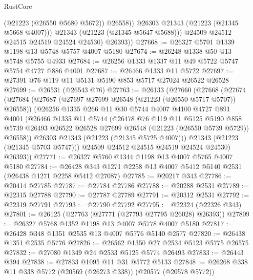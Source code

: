 \begin{lexlean}{RustCore}
\begin{coremodule}
                  (@21223 (@26550 @5680 @5672))
                  @26558))
              @26303
              @21343
              (@21223 (@21345 @5668 @4007)))
            @21343
            (@21223 (@21345 @5647 @5688)))
          @24509
          @24512
          @24515
          @24519
          @24524
          @24530)
        @26393))
@27668 := @26327 @5701 @1339 @1198 @13 @5748 @5757 @4007 @5180
@27674 := @26248 @1338 @50 @13 @5748 @5755 @4933
@27684 := @26256 @1333 @1337 @11 @49 @5722 @5747 @5754 @4727 @886 @4001
@27687 := @26466 @1333 @11 @5722
@27697 := @27391 @76 @119 @11 @5131 @5190 @853 @5717 @27024 @26522 @26528
@27699 := @26531 (@26543 @76)
@27763 := @26133
    (@27660
      (@27668
        (@27674
          (@27684
            (@27687 (@27697 @27699 @26548 (@21223 (@26550 @5717 @5707)) @26558))
            (@26256
              @1335
              @266
              @11
              @30
              @5744
              @4007
              @4100
              @4727
              @891
              @4001
              (@26466
                @1335
                @11
                @5744
                (@26478
                  @76
                  @119
                  @11
                  @5125
                  @5190
                  @858
                  @5739
                  @26493
                  @26522
                  @26528
                  @27699
                  @26548
                  (@21223 (@26550 @5739 @5729))
                  @26558))
              @26303
              @21343
              (@21223 (@21345 @5725 @4007)))
            @21343
            (@21223 (@21345 @5703 @5747)))
          @24509
          @24512
          @24515
          @24519
          @24524
          @24530)
        @26393))
@27771 := @26327 @5760 @1344 @1198 @13 @4007 @5765 @4007 @5180
@27784 := @26428 @343 @1271 @2258 @13 @4007 @5412 @5140 @2531 (@26438 @1271 @2258 @5412 @27087)
@27785 := @20217 @343
@27786 := @20414 @27785
@27787 := @27784 @27786
@27788 := @20288 @2531
@27789 := @22315 @27788
@27790 := @27787 @27789
@27791 := @20312 @2531
@27792 := @22319 @27791
@27793 := @27790 @27792
@27795 := @22324 (@22326 @343)
@27801 := @26125 (@27763 (@27771 (@27793 @27795 @26028) @26393))
@27809 := @26327 @5768 @1352 @1198 @13 @4007 @5778 @4007 @5180
@27817 := @26428 @348 @1351 @2535 @13 @4007 @5776 @5140 @2577
@27820 := @26438 @1351 @2535 @5776
@27826 := @26562 @1350 @27 @2534 @5123 @5775 @26575
@27832 := @27080 @1349 @24 @2533 @5125 @5774 @26493
@27833 := @26443 @394
@27838 := @27833 @1095 @11 @31 @5772 @5133
@27848 := @26268 @338 @11 @338 @5772 (@20569 (@26273 @338)) (@20577 (@20578 @5772))

\end{coremodule}
\end{lexlean}
